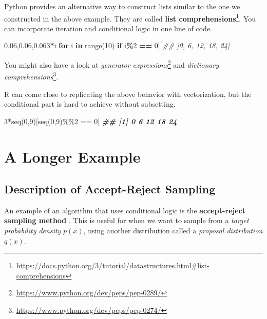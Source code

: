 \documentclass[
  12pt,
]{krantz}
\makeatletter
\newenvironment{Shaded}{\begin{snugshade}}{\end{snugshade}}
\newcommand{\BuiltInTok}[1]{#1}
\newcommand{\CommentTok}[1]{\textcolor[rgb]{0.37,0.37,0.37}{\textit{#1}}}
\newcommand{\ControlFlowTok}[1]{\textcolor[rgb]{0.27,0.27,0.27}{\textbf{#1}}}
\newcommand{\DecValTok}[1]{\textcolor[rgb]{0.06,0.06,0.06}{#1}}
\newcommand{\DocumentationTok}[1]{\textcolor[rgb]{0.37,0.37,0.37}{\textbf{\textit{#1}}}}
\newcommand{\FunctionTok}[1]{\textcolor[rgb]{0,0,0}{#1}}
\newcommand{\KeywordTok}[1]{\textcolor[rgb]{0.27,0.27,0.27}{\textbf{#1}}}
\newcommand{\NormalTok}[1]{#1}
\newcommand{\OperatorTok}[1]{\textcolor[rgb]{0.43,0.43,0.43}{\textbf{#1}}}
\newcommand{\SpecialCharTok}[1]{\textcolor[rgb]{0,0,0}{#1}}
\renewcommand{\href}[2]{#2\footnote{\url{#1}}}
\newenvironment{kframe}{%
\medskip{}
\setlength{\fboxsep}{.8em}
 \def\at@end@of@kframe{}%
 \ifinner\ifhmode%
  \def\at@end@of@kframe{\end{minipage}}%
  \begin{minipage}{\columnwidth}%
 \fi\fi%
 \def\FrameCommand##1{\hskip\@totalleftmargin \hskip-\fboxsep
 \colorbox{shadecolor}{##1}\hskip-\fboxsep
     \hskip-\linewidth \hskip-\@totalleftmargin \hskip\columnwidth}%
 \MakeFramed {\advance\hsize-\width
   \@totalleftmargin\z@ \linewidth\hsize
   \@setminipage}}%
 {\par\unskip\endMakeFramed%
 \at@end@of@kframe}
\renewenvironment{Shaded}{\begin{kframe}}{\end{kframe}}
\makeatother
\begin{document}
Python provides an alternative way to construct lists similar to the one we constructed in the above example. They are called \href{https://docs.python.org/3/tutorial/datastructures.html\#list-comprehensions}{\textbf{list comprehensions}}. You can incorporate iteration and conditional logic in one line of code.

\begin{Shaded}
\begin{Highlighting}[]
\NormalTok{[}\DecValTok{3}\OperatorTok{*}\NormalTok{i }\ControlFlowTok{for}\NormalTok{ i }\KeywordTok{in} \BuiltInTok{range}\NormalTok{(}\DecValTok{10}\NormalTok{) }\ControlFlowTok{if}\NormalTok{ i}\OperatorTok{\%}\DecValTok{2} \OperatorTok{==} \DecValTok{0}\NormalTok{]}
\CommentTok{\#\# [0, 6, 12, 18, 24]}
\end{Highlighting}
\end{Shaded}

You might also have a look at \href{https://www.python.org/dev/peps/pep-0289/}{\emph{generator expressions}} and \href{https://www.python.org/dev/peps/pep-0274/}{\emph{dictionary comprehensions}}.

R can come close to replicating the above behavior with vectorization, but the conditional part is hard to achieve without subsetting.

\begin{Shaded}
\begin{Highlighting}[]
\DecValTok{3}\SpecialCharTok{*}\FunctionTok{seq}\NormalTok{(}\DecValTok{0}\NormalTok{,}\DecValTok{9}\NormalTok{)[}\FunctionTok{seq}\NormalTok{(}\DecValTok{0}\NormalTok{,}\DecValTok{9}\NormalTok{)}\SpecialCharTok{\%\%}\DecValTok{2} \SpecialCharTok{==} \DecValTok{0}\NormalTok{]}
\DocumentationTok{\#\# [1]  0  6 12 18 24}
\end{Highlighting}
\end{Shaded}

\hypertarget{a-longer-example}{%
\section{A Longer Example}\label{a-longer-example}}

\hypertarget{description-of-accept-reject-sampling}{%
\subsection{Description of Accept-Reject Sampling}\label{description-of-accept-reject-sampling}}

An example of an algorithm that uses conditional logic is the \textbf{accept-reject sampling method} \citep{monte-carlo-stat-methods}. This is useful for when we want to sample from a \emph{target probability density} \(p(x)\), using another distribution called a \emph{proposal distribution} \(q(x)\).
\end{document}
